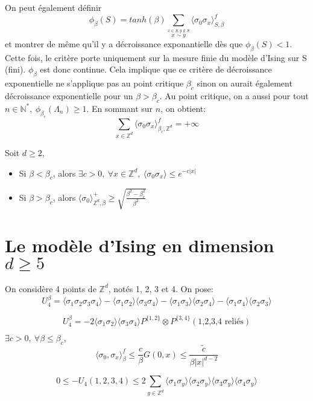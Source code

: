 \documentclass[a4paper,12pt]{report}
\begin{document}
On peut également définir
$$\phi_{\beta}(S) = tanh(\beta) \sum_{\overset{x\in S, y \notin S}{x \sim y}} \langle \sigma_0 \sigma_x \rangle^f_{S,\beta}$$
et montrer de même qu'il y a décroissance exponantielle dès que $\phi_{\beta}(S) <1$. Cette fois, le critère porte uniquement sur la mesure finie du modèle d'Ising sur S (fini). $\phi_{\beta}$ est donc continue. Cela implique que ce critère de décroissance exponentielle ne s'applique pas au point critique $\beta_c$ sinon on aurait également décroissance exponentielle pour un $\beta > \beta_c$. Au point critique, on a aussi pour tout $n \in \mathbb{N}^*, \ \phi_{\beta_c}(\Lambda_n) \geq 1$. En sommant sur $n$, on obtient:
$$
\sum_{x \in \mathbb{Z}^d} \langle \sigma_0 \sigma_x \rangle^f_{\beta_c, \mathbb{Z}^d} = + \infty
$$

\begin{thm}
Soit $d \geq 2$,
\begin{itemize}
\item Si $\beta < \beta_c$, alors $\exists c >0, \ \forall x \in \mathbb{Z}^d, \ \langle \sigma_0 \sigma_x \rangle \leq e^{-c \vert x \vert}$
\item Si $\beta > \beta_c$, alors $\langle \sigma_0 \rangle^+_{\mathbb{Z}^d,\beta} \geq \sqrt{\frac{\beta^2 - \beta_c^2}{\beta^2}}$
\end{itemize}
\end{thm}
\newpage

\section{Le modèle d'Ising en dimension $d \geq 5$}

On considère 4 points de $\mathbb{Z}^d$, notés 1, 2, 3 et 4. On pose:
$$
U_4^{\beta} = \langle \sigma_1 \sigma_2 \sigma_3 \sigma_4 \rangle - \langle \sigma_1 \sigma_2 \rangle \langle \sigma_3 \sigma_4 \rangle - \langle \sigma_1 \sigma_3 \rangle \langle \sigma_2 \sigma_4 \rangle - \langle \sigma_1 \sigma_4 \rangle \langle \sigma_2 \sigma_3 \rangle
$$

\begin{prop}
$$
U_4^{\beta} = -2\langle \sigma_1 \sigma_2 \rangle \langle \sigma_3 \sigma_4 \rangle P^{\{1,2\}} \otimes P^{\{3,4\}}(\text{1,2,3,4 reliés})
$$
\end{prop}

\begin{thm}
$\exists c > 0, \ \forall \beta \leq \beta_c,$
$$
\langle \sigma_0, \sigma_x \rangle^f_{\beta} \leq \frac{c}{\beta} G(0,x) \leq \frac{\tilde{c}}{\beta \vert x \vert^{d-2}}
$$
\end{thm}

\begin{prop}
$$
0 \leq - U_4(1,2,3,4) \leq 2 \sum_{y \in \mathbb{Z}^d} \langle \sigma_1 \sigma_y \rangle \langle \sigma_2 \sigma_y \rangle \langle \sigma_3 \sigma_y \rangle \langle \sigma_4 \sigma_y \rangle
$$
\end{prop}
\end{document}
